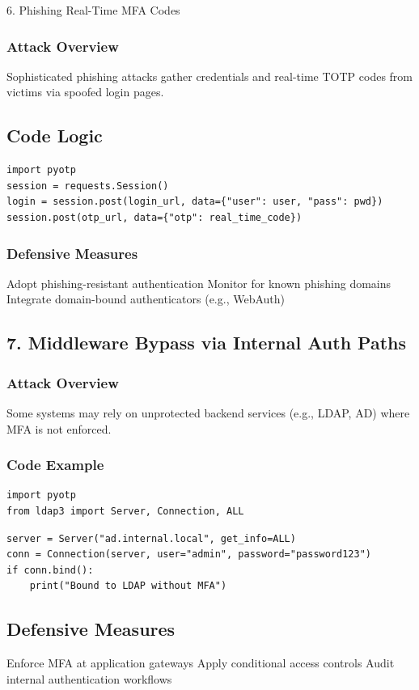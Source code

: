 6. Phishing Real-Time MFA Codes

\subsubsection{Attack Overview}
Sophisticated phishing attacks gather credentials and real-time TOTP codes from victims via spoofed login pages.

\subsection{Code Logic}
\begin{lstlisting}
import pyotp
session = requests.Session()
login = session.post(login_url, data={"user": user, "pass": pwd})
session.post(otp_url, data={"otp": real_time_code})
\end{lstlisting}

\subsubsection{Defensive Measures}
Adopt phishing-resistant authentication
Monitor for known phishing domains
Integrate domain-bound authenticators (e.g., WebAuth)
\subsection{7. Middleware Bypass via Internal Auth Paths}
\subsubsection{Attack Overview}
 Some systems may rely on unprotected backend services (e.g., LDAP, AD) where MFA is not enforced.

\subsubsection{Code Example}
\begin{lstlisting}
import pyotp
from ldap3 import Server, Connection, ALL   
\end{lstlisting}    

\begin{lstlisting}
server = Server("ad.internal.local", get_info=ALL)
conn = Connection(server, user="admin", password="password123")
if conn.bind():
    print("Bound to LDAP without MFA")    
\end{lstlisting}

\subsection{Defensive Measures}
Enforce MFA at application gateways
Apply conditional access controls
Audit internal authentication workflows


